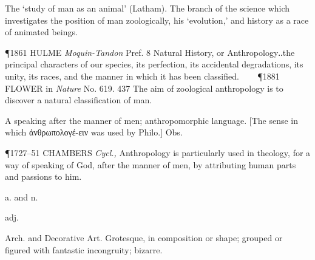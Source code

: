 \begin{description}[wide, labelwidth=!, labelindent=0pt]
\begin{myenumerate}
 The ‘study of man as an animal’ (Latham). The branch of the science which
investigates the position of man zoologically, his ‘evolution,’ and history as a
race of animated beings. 

\P 1861 HULME \textit{Moquin-Tandon} Pref. 8 Natural History, or Anthropology‥the
principal characters of our species, its perfection, its accidental
degradations, its unity, its races, and the manner in which it has been
classified.    
\P 1881 FLOWER in \textit{Nature} No. 619. 437 The aim of zoological
anthropology is to discover a natural classification of man.

 A speaking after the manner of men; anthropomorphic language. [The sense in
which ἀνθρωπολογέ-ειν was used by Philo.] Obs. 

\P 1727–51 CHAMBERS \textit{Cycl.,} Anthropology is particularly used in theology, for a
way of speaking of God, after the manner of men, by attributing human parts and
passions to him.
\end{myenumerate}

  a. and n.

\noindent  {}

\vspace{-0.3cm}

\begin{myenumerate}
 adj. 

 Arch. and Decorative Art. Grotesque, in composition or shape; grouped or
figured with fantastic incongruity; bizarre. 


\end{myenumerate}
\end{description}

